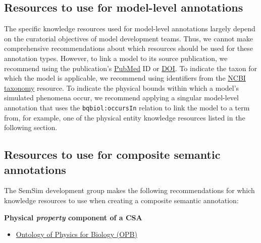 \documentclass[pdftex,rgb,dvipsnames,svgnames,hyperref,table]{report}
\begin{document}
\subsection{Resources to use for model-level annotations}
The specific knowledge resources used for model-level annotations largely depend on the curatorial objectives of model development teams. Thus, we cannot make comprehensive recommendations about which resources should be used for these annotation types. However, to link a model to its source publication, we recommend using the publication's \href{https://registry.identifiers.org/registry/pubmed}{PubMed} ID or \href{https://registry.identifiers.org/registry/doi}{DOI}. To indicate the taxon for which the model is applicable, we recommend using identifiers from the \href{https://registry.identifiers.org/registry/taxonomy}{NCBI taxonomy} resource. To indicate the physical bounds within which a model's simulated phenomena occur, we recommend applying a singular model-level annotation that uses the \texttt{bqbiol:occursIn} relation to link the model to a term from, for example, one of the physical entity knowledge resources listed in the following section.


\subsection{Resources to use for composite semantic annotations}
The SemSim development group makes the following recommendations for which knowledge resources to use when creating a composite semantic annotation:

\textbf{Physical \textit{property} component of a CSA}
\begin{itemize}
\item \href{https://registry.identifiers.org/registry/opb}{Ontology of Physics for Biology (OPB)}
\end{itemize}
\end{document}
